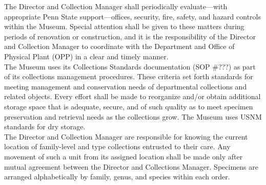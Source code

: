 \documentclass[letterpaper, 11pt]{article}
\begin{document}
\noindent{}The Director and Collection Manager shall periodically evaluate---with appropriate Penn State support---offices, security, fire, safety, and hazard controls within the Museum. Special attention shall be given to these matters during periods of renovation or construction, and it is the responsibility of the Director and Collection Manager to coordinate with the Department and Office of Physical Plant (OPP) in a clear and timely manner.\\

\noindent{}The Museum uses its Collections Standards documentation (SOP \#???) %
as part of its collections management procedures. These criteria set forth standards for meeting management and conservation needs of departmental collections and related objects. Every effort shall be made to reorganize and/or obtain additional storage space that is adequate, secure, and of such quality as to meet specimen preservation and retrieval needs as the collections grow. The Museum uses USNM standards for dry storage.\\

\noindent{}The Director and Collection Manager are responsible for knowing the current location of family-level and type collections entrusted to their care. Any movement of such a unit from its assigned location shall be made only after mutual agreement between the Director and Collections Manager. Specimens are arranged alphabetically by family, genus, and species within each order.
\end{document}
